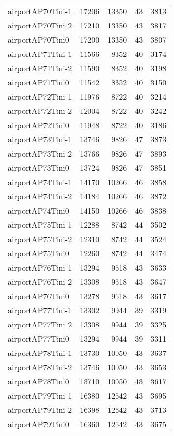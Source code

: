 \begin{tabular}{lrrrr}
airportAP70Tini-1 & 17206 & 13350 & 43 & 3813 \\
airportAP70Tini-2 & 17210 & 13350 & 43 & 3817 \\
airportAP70Tini0 & 17200 & 13350 & 43 & 3807 \\
airportAP71Tini-1 & 11566 & 8352 & 40 & 3174 \\
airportAP71Tini-2 & 11590 & 8352 & 40 & 3198 \\
airportAP71Tini0 & 11542 & 8352 & 40 & 3150 \\
airportAP72Tini-1 & 11976 & 8722 & 40 & 3214 \\
airportAP72Tini-2 & 12004 & 8722 & 40 & 3242 \\
airportAP72Tini0 & 11948 & 8722 & 40 & 3186 \\
airportAP73Tini-1 & 13746 & 9826 & 47 & 3873 \\
airportAP73Tini-2 & 13766 & 9826 & 47 & 3893 \\
airportAP73Tini0 & 13724 & 9826 & 47 & 3851 \\
airportAP74Tini-1 & 14170 & 10266 & 46 & 3858 \\
airportAP74Tini-2 & 14184 & 10266 & 46 & 3872 \\
airportAP74Tini0 & 14150 & 10266 & 46 & 3838 \\
airportAP75Tini-1 & 12288 & 8742 & 44 & 3502 \\
airportAP75Tini-2 & 12310 & 8742 & 44 & 3524 \\
airportAP75Tini0 & 12260 & 8742 & 44 & 3474 \\
airportAP76Tini-1 & 13294 & 9618 & 43 & 3633 \\
airportAP76Tini-2 & 13308 & 9618 & 43 & 3647 \\
airportAP76Tini0 & 13278 & 9618 & 43 & 3617 \\
airportAP77Tini-1 & 13302 & 9944 & 39 & 3319 \\
airportAP77Tini-2 & 13308 & 9944 & 39 & 3325 \\
airportAP77Tini0 & 13294 & 9944 & 39 & 3311 \\
airportAP78Tini-1 & 13730 & 10050 & 43 & 3637 \\
airportAP78Tini-2 & 13746 & 10050 & 43 & 3653 \\
airportAP78Tini0 & 13710 & 10050 & 43 & 3617 \\
airportAP79Tini-1 & 16380 & 12642 & 43 & 3695 \\
airportAP79Tini-2 & 16398 & 12642 & 43 & 3713 \\
airportAP79Tini0 & 16360 & 12642 & 43 & 3675 \\

\end{tabular}
